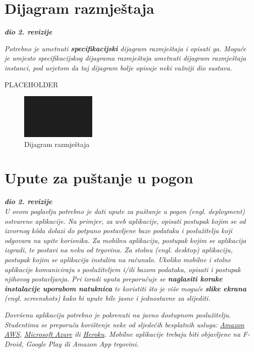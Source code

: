 			\eject 
		
		
		\section{Dijagram razmještaja}
			
			\textbf{\textit{dio 2. revizije}}
			
			 \textit{Potrebno je umetnuti \textbf{specifikacijski} dijagram razmještaja i opisati ga. Moguće je umjesto specifikacijskog dijagrama razmještaja umetnuti dijagram razmještaja instanci, pod uvjetom da taj dijagram bolje opisuje neki važniji dio sustava.}
			
			PLACEHOLDER
		
			\begin{figure}[H]
				\includegraphics[scale=0.60]{slike/DR.jpg} %
				\centering
				\caption{Dijagram razmještaja}
				\label{fig:DijagramRazmjestaja}
			\end{figure}

			\eject 
		
		\section{Upute za puštanje u pogon}
		
			\textbf{\textit{dio 2. revizije}}\\
		
			 \textit{U ovom poglavlju potrebno je dati upute za puštanje u pogon (engl. deployment) ostvarene aplikacije. Na primjer, za web aplikacije, opisati postupak kojim se od izvornog kôda dolazi do potpuno postavljene baze podataka i poslužitelja koji odgovara na upite korisnika. Za mobilnu aplikaciju, postupak kojim se aplikacija izgradi, te postavi na neku od trgovina. Za stolnu (engl. desktop) aplikaciju, postupak kojim se aplikacija instalira na računalo. Ukoliko mobilne i stolne aplikacije komuniciraju s poslužiteljem i/ili bazom podataka, opisati i postupak njihovog postavljanja. Pri izradi uputa preporučuje se \textbf{naglasiti korake instalacije uporabom natuknica} te koristiti što je više moguće \textbf{slike ekrana} (engl. screenshots) kako bi upute bile jasne i jednostavne za slijediti.}
			
			
			 \textit{Dovršenu aplikaciju potrebno je pokrenuti na javno dostupnom poslužitelju. Studentima se preporuča korištenje neke od sljedećih besplatnih usluga: \href{https://aws.amazon.com/}{Amazon AWS}, \href{https://azure.microsoft.com/en-us/}{Microsoft Azure} ili \href{https://www.heroku.com/}{Heroku}. Mobilne aplikacije trebaju biti objavljene na F-Droid, Google Play ili Amazon App trgovini.}
			
			
			\eject 